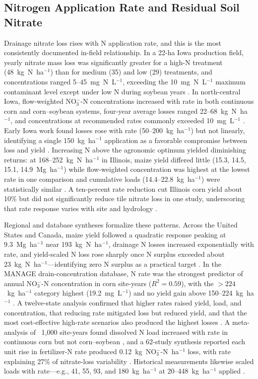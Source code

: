 \subsection{Nitrogen Application Rate and Residual Soil Nitrate}

Drainage nitrate loss rises with N application rate, and this is the most consistently documented in-field relationship. In a 22-ha Iowa production field, yearly nitrate mass loss was significantly greater for a high-N treatment (48~kg~N~ha$^{-1}$) than for medium (35) and low (29) treatments, and concentrations ranged 5--45~mg~N~L$^{-1}$, exceeding the 10~mg~N~L$^{-1}$ maximum contaminant level except under low N during soybean years \parencite{Jaynes2001}. In north-central Iowa, flow-weighted NO$_3^-$-N concentrations increased with rate in both continuous corn and corn--soybean systems, four-year average losses ranged 22--68~kg~N~ha$^{-1}$, and concentrations at recommended rates commonly exceeded 10~mg~L$^{-1}$ \parencite{Helmers2012b}. Early Iowa work found losses rose with rate (50--200~kg~ha$^{-1}$) but not linearly, identifying a single 150~kg~ha$^{-1}$ application as a favorable compromise between loss and yield \parencite{Azevedo1997}. Increasing N above the agronomic optimum yielded diminishing returns: at 168--252~kg~N~ha$^{-1}$ in Illinois, maize yield differed little (15.3, 14.5, 15.1, 14.9~Mg~ha$^{-1}$) while flow-weighted concentration was highest at the lowest rate in one comparison and cumulative loads (14.4--22.8~kg~ha$^{-1}$) were statistically similar \parencite{Li2023b}. A ten-percent rate reduction cut Illinois corn yield about 10\% but did not significantly reduce tile nitrate loss in one study, underscoring that rate response varies with site and hydrology \parencite{Gentry2024}.

Regional and database syntheses formalize these patterns. Across the United States and Canada, maize yield followed a quadratic response peaking at 9.3~Mg~ha$^{-1}$ near 193~kg~N~ha$^{-1}$, drainage N losses increased exponentially with rate, and yield-scaled N loss rose sharply once N surplus exceeded about 23~kg~N~ha$^{-1}$---identifying zero N surplus as a practical target \parencite{Zhao2016}. In the MANAGE drain-concentration database, N rate was the strongest predictor of annual NO$_3^-$-N concentration in corn site-years ($R^2=0.59$), with the $>224$~kg~ha$^{-1}$ category highest (19.2~mg~L$^{-1}$) and no yield gain above 150--224~kg~ha$^{-1}$ \parencite{Hertzberger2019}. A twelve-state analysis confirmed that higher rates raised yield, load, and concentration, that reducing rate mitigated loss but reduced yield, and that the most cost-effective high-rate scenarios also produced the highest losses \parencite{Liu2021}. A meta-analysis of ~1,000 site-years found dissolved N load increased with rate in continuous corn but not corn--soybean \parencite{Christianson2015b}, and a 62-study synthesis reported each unit rise in fertilizer-N rate produced 0.12~kg~NO$_3^-$-N~ha$^{-1}$ loss, with rate explaining 27\% of nitrate-loss variability \parencite{Chatterjee2020b}. Historical measurements likewise scaled loads with rate---e.g., 41, 55, 93, and 180~kg~ha$^{-1}$ at 20--448~kg~ha$^{-1}$ applied \parencite{Ritter2015}.

